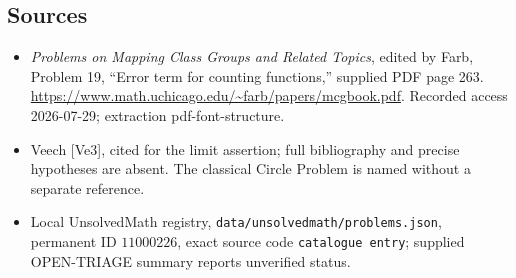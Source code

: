 \documentclass[11pt]{article}
\begin{document}
\subsection{Sources}
\begin{itemize}
\item \emph{Problems on Mapping Class Groups and Related Topics}, edited by Farb, Problem 19, ``Error term for counting functions,'' supplied PDF page 263. \url{https://www.math.uchicago.edu/~farb/papers/mcgbook.pdf}. Recorded access 2026-07-29; extraction pdf-font-structure.
\item Veech [Ve3], cited for the limit assertion; full bibliography and precise hypotheses are absent. The classical Circle Problem is named without a separate reference.
\item Local UnsolvedMath registry, \texttt{data/unsolvedmath/problems.json}, permanent ID \(11000226\), exact source code \texttt{catalogue entry}; supplied OPEN-TRIAGE summary reports unverified status.
\end{itemize}
\end{document}
